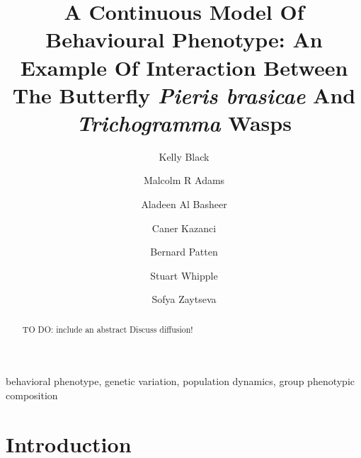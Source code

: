 \documentclass[review,authoryear]{elsarticle}
\begin{document}
\begin{frontmatter}

\title{A Continuous Model Of Behavioural Phenotype: An Example Of
  Interaction Between The Butterfly \textit{Pieris brasicae} And
  \textit{Trichogramma} Wasps}

\author[math]{Kelly Black}\author[math]{Malcolm R Adams}\author[math]{Aladeen Al Basheer}\author[math,engineering]{Caner Kazanci}\author[odum]{Bernard Patten}\author[odum]{Stuart Whipple}\author[math]{Sofya Zaytseva}

\address[math]{Department of Mathematics, University of Georgia, Athens, GA 30602, USA}
\address[engineering]{College of Engineering, University of Georgia, Athens, GA 30602, USA}
\address[odum]{Odum School of Ecology and College of Engineering, University of Georgia, Athens, GA 30602, USA}



\begin{abstract}
TO DO: include an abstract
Discuss diffusion!
\end{abstract}

\begin{keyword}
behavioral phenotype, genetic variation, population dynamics, group phenotypic composition
\end{keyword}

\end{frontmatter}

\linenumbers


\section{Introduction}
\end{document}
